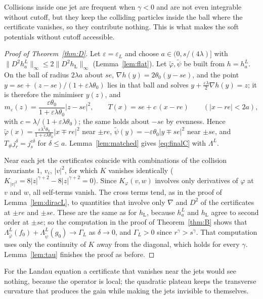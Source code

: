 \documentclass[11pt]{amsart}
\theoremstyle{definition}
\newcommand{\hL}{h_{\mathrm L}}
\begin{document}
Collisions inside one jet are frequent when $\gamma<0$ and are not even integrable without cutoff, but they keep the colliding particles inside the ball where the certificate vanishes, so they contribute nothing. This is what makes the soft potentials without cutoff accessible.

\begin{proof}[Proof of Theorem~\ref{thm:D}]
Let $\varepsilon=\varepsilon_L$ and choose $a\in(0,s/(4\lambda)]$ with $\|D^2h^L_a\|_\infty\le2\|D^2\hL\|_\infty$ (Lemma~\ref{lem:flat}). Let $\tilde\varphi,\tilde\psi$ be built from $h=h^L_a$. On the ball of radius $2\lambda a$ about $se$, $\nabla h(y)=2\theta_0(y-se)$, and the point $y=se+(z-se)/(1+\varepsilon\lambda\theta_0)$ lies in that ball and solves $y+\frac{\varepsilon\lambda}2\nabla h(y)=z$; it is therefore the minimiser $y(z)$, and
\[
m_\varepsilon(z)=\frac{\varepsilon\theta_0}{1+\varepsilon\lambda\theta_0}|z-se|^2,\qquad T(x)=se+c\,(x-re)\qquad(|x-re|<2a),
\]
with $c=\lambda/(1+\varepsilon\lambda\theta_0)$; the same holds about $-se$ by evenness. Hence $\tilde\varphi(x)=\frac{\varepsilon\lambda^2\theta_0}{1+\varepsilon\lambda\theta_0}|x\mp re|^2$ near $\pm re$, $\tilde\psi(y)=-\varepsilon\theta_0|y\mp se|^2$ near $\pm se$, and $T_\#j^\delta_r=j^{c\delta}_s$ for $\delta\le a$. Lemma~\ref{lem:matched} gives \eqref{eq:finalC} with $\Lambda^L$.

Near each jet the certificates coincide with combinations of the collision invariants $1$, $v_i$, $|v|^2$, for which $K$ vanishes identically ($K_{|v|^2}=8|z|^{\gamma+2}-8|z|^{\gamma+2}=0$). Since $K_\varphi(v,w)$ involves only derivatives of $\varphi$ at $v$ and $w$, all self-terms vanish. The cross terms tend, as in the proof of Lemma~\ref{lem:diracL}, to quantities that involve only $\nabla$ and $D^2$ of the certificates at $\pm re$ and $\pm se$. These are the same as for $\hL$, because $h^L_a$ and $\hL$ agree to second order at $\pm se$; so the computation in the proof of Theorem~\ref{thm:B} shows that $\Lambda^L_{\tilde\varphi}(f_0)+\Lambda^L_{\tilde\psi}(g_0)\to\Gamma_L$ as $\delta\to0$, and $\Gamma_L>0$ since $r^\gamma>s^\gamma$. That computation uses only the continuity of $K$ away from the diagonal, which holds for every $\gamma$. Lemma~\ref{lem:tau} finishes the proof as before.
\end{proof}

For the Landau equation a certificate that vanishes near the jets would see nothing, because the operator is local; the quadratic plateau keeps the transverse curvature that produces the gain while making the jets invisible to themselves.
\end{document}
